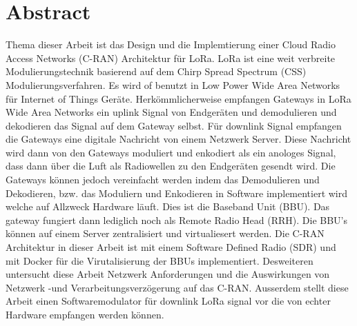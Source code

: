 \chapter*{Abstract}


Thema dieser Arbeit ist das Design und die Implemtierung einer Cloud Radio Access Networks (C-RAN)
Architektur für LoRa. LoRa ist eine weit verbreite Modulierungstechnik basierend auf dem Chirp Spread Spectrum (CSS)
Modulierungsverfahren. Es wird of benutzt in Low Power Wide Area Networks für Internet of Things Geräte. Herkömmlicherweise
empfangen Gateways in LoRa Wide Area Networks ein uplink Signal von Endgeräten und demodulieren und dekodieren das Signal
auf dem Gateway selbst. Für downlink Signal empfangen die Gateways eine digitale Nachricht von einem Netzwerk Server. Diese 
Nachricht wird dann von den Gateways moduliert und enkodiert als ein anologes Signal, dass dann über die Luft als Radiowellen
zu den Endgeräten gesendt wird. Die Gateways können jedoch vereinfacht werden indem das Demodulieren und Dekodieren, bzw. das Moduliern und Enkodieren
in Software implementiert wird welche auf Allzweck Hardware läuft. Dies ist die Baseband Unit (BBU). Das gateway fungiert dann 
lediglich noch als Remote Radio Head (RRH). Die BBU's können auf einem Server zentralisiert und virtualiesert werden.
Die C-RAN Architektur in dieser Arbeit ist mit einem Software Defined Radio (SDR) und mit Docker für die Virutalisierung der BBUs implementiert.
Desweiteren untersucht diese Arbeit Netzwerk Anforderungen und die Auswirkungen von Netzwerk -und Verarbeitungsverzögerung auf das C-RAN.
Ausserdem stellt diese Arbeit einen Softwaremodulator für downlink LoRa signal vor die von echter Hardware empfangen werden können.


